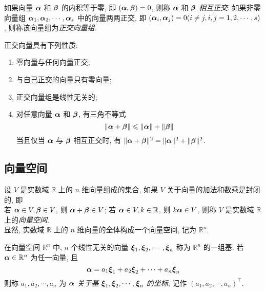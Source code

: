 \begin{definition}[向量的正交]
    如果向量 $ \vb*{\alpha} $ 和 $ \vb*{\beta} $ 的内积等于零, 即 $ (\vb*{\alpha}, \vb*{\beta})=0 $, 则称  $\vb*{\alpha} $ 和 $ \vb*{\beta} $ \textit{相互正交}. 如果非零向量组 $ \vb*{\alpha}_{1}, \vb*{\alpha}_{2}, \cdots, \vb*{\alpha}_{s} $ 中的向量两两正交, 即 $ \left(\vb*{\alpha}_{i}, \vb*{\alpha}_{j}\right)=0(i \neq j, i, j=1 ,  2, \cdots, s) $, 则称该向量组为\textit{正交向量组}.
\end{definition}

正交向量具有下列性质:
\begin{enumerate}[label=(\arabic{*})]
    \item 零向量与任何向量正交;
    \item 与自己正交的向量只有零向量;
    \item 正交向量组是线性无关的;
    \item 对任意向量 $ \vb*{\alpha} $ 和 $ \vb*{\beta} $, 有三角不等式
          $$\|\vb*{\alpha}+\vb*{\beta}\| \leqslant\|\vb*{\alpha}\|+\|\vb*{\beta}\|$$
          当且仅当 $ \vb*{\alpha} $ 与 $ \vb*{\beta} $ 相互正交时, 有 $ \|\vb*{\alpha}+\vb*{\beta}\|^{2}=\|\vb*{\alpha}\|^{2}+\|\vb*{\beta}\|^{2} $.
\end{enumerate}

\subsection{向量空间}

\begin{definition}[向量空间]
    设 $ V $ 是实数域 $ \mathbb{R} $ 上的 $ n $ 维向量组成的集合, 如果 $ V $ 关于向量的加法和数乘是封闭的, 即\\
    若 $ \vb*{\alpha} \in V, \vb*{\beta} \in V $, 则 $ \vb*{\alpha}+\vb*{\beta} \in V $; 若 $ \vb*{\alpha} \in V, k \in \mathbb{R} $, 则 $ k \vb*{\alpha} \in V $, 则称 $ V $ 是实数域 $ \mathbb{R} $ 上的\textit{向量空间}.\\
    显然, 实数域 $ \mathbb{R} $ 上的 $ n $ 维向量的全体构成一个向量空间, 记为 $ \mathbb{R}^{n} $.
\end{definition}

\begin{definition}[基与坐标]
    在向量空间 $ \mathbb{R}^{n} $ 中, $ n $ 个线性无关的向量 $ \vb*{\xi}_{1}, \vb*{\xi}_{2}, \cdots, \vb*{\xi}_{n} $ 称为 $ \mathbb{R}^{n} $ 的一组基. 若 $ \vb*{\alpha} \in \mathbb{R}^{n} $ 为任一向量, 且
    $$\vb*{\alpha}=a_{1} \vb*{\xi}_{1}+a_{2} \vb*{\xi}_{2}+\cdots+a_{n} \vb*{\xi}_{n}$$
    则称 $ a_{1}, a_{2}, \cdots, a_{n} $ 为 $ \vb*{\alpha} $ \textit{关于基} $ \vb*{\xi}_{1}, \vb*{\xi}_{2}, \cdots, \vb*{\xi}_{n} $ \textit{的坐标}, 记作 $ \left(a_{1}, a_{2}, \cdots, a_{n}\right)^{\top} $.
\end{definition}

